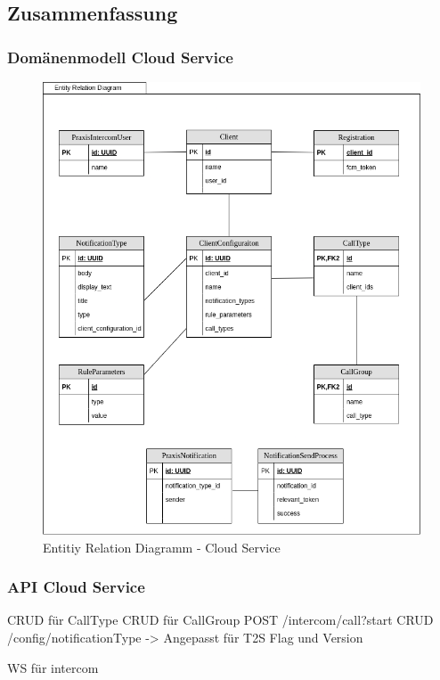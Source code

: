 \subsection{Zusammenfassung}

\subsubsection*{Domänenmodell Cloud Service}

\begin{figure}[h]
    \centering
    \begin{minipage}[b]{0.9\textwidth}
        \includegraphics[width=\textwidth]{graphics/diagramms/erd_v02}
        \caption{Entitiy Relation Diagramm - Cloud Service}
    \end{minipage}
\end{figure}

\clearpage

\subsubsection*{API Cloud Service}

CRUD für CallType
CRUD für CallGroup
POST /intercom/call?start
CRUD /config/notificationType -> Angepasst für T2S Flag und Version

WS für intercom


\clearpage
